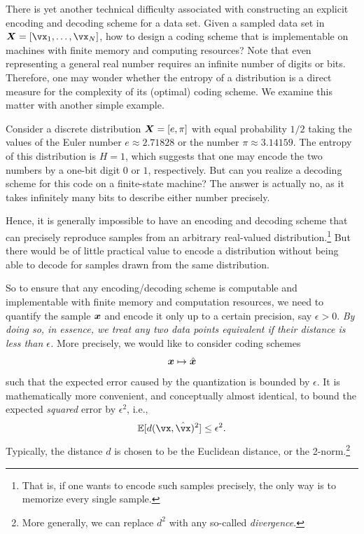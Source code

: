 \documentclass[../../book-main.tex]{subfiles}
\begin{document}

There is yet another technical difficulty associated with constructing an explicit encoding and decoding scheme for a data set. Given a sampled data set in $\X = [\vx_1, \ldots, \vx_N]$, how to design a coding scheme that is implementable on machines with finite memory and computing resources? Note that even representing a general real number requires an infinite number of digits or bits. Therefore, one may wonder whether the entropy of a distribution is a direct measure for the complexity of its (optimal) coding scheme. We examine this matter with another simple example.
\begin{example}[Precision] \label{eg:two-inrational}
	Consider a discrete distribution $\bm{X} = [e, \pi]$ with equal probability $1/2$ taking the values of the Euler number $e \approx 2.71828$ or the number $\pi \approx 3.14159$. The entropy of this distribution is $H =1$, which suggests that one may encode the two numbers by a one-bit digit $0$ or $1$, respectively. But can you realize a decoding scheme for this code on a finite-state machine? The answer is actually no, as it takes infinitely many bits to describe either number precisely.
\end{example}

Hence, it is generally impossible to have an encoding and decoding scheme that can precisely reproduce samples from an arbitrary real-valued distribution.\footnote{That is, if one wants to encode such samples precisely, the only way is to memorize every single sample. } But there would be of little practical value to encode a distribution without being able to decode for samples drawn from the same distribution.

So to ensure that any encoding/decoding scheme is computable and implementable with finite memory and computation resources, we need to quantify the sample $\bm{x}$ and encode it only up to a certain precision, say $\epsilon > 0$. {\em By doing so, in essence, we treat any two data points equivalent if their distance is less than $\epsilon$.} More precisely, we would like to consider coding schemes
\begin{equation}
	\bm{x} \mapsto \hat {\bm{x}}
\end{equation}
such that the expected error caused by the quantization is bounded by $\epsilon$. It is mathematically more convenient, and conceptually almost identical, to bound the expected \textit{squared} error by \(\epsilon^{2}\), i.e., 
\begin{equation}
	\Ex[d(\vx, \hat \vx)^{2}] \le \epsilon^{2}.
\end{equation}
Typically, the distance \(d\) is chosen to be the Euclidean distance, or the 2-norm.\footnote{More generally, we can replace \(d^{2}\) with any so-called \textit{divergence}.}
\end{document}
